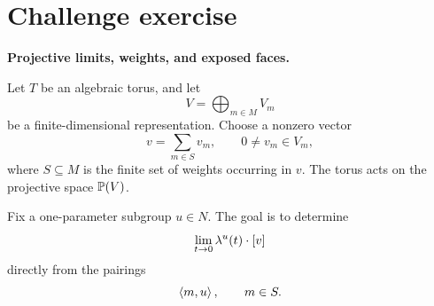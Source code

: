 \clearpage
\section*{Challenge exercise}

\noindent
\textbf{Projective limits, weights, and exposed faces.}

\medskip

Let \(T\) be an algebraic torus, and let
\[
V=\bigoplus_{m\in M}V_m
\]
be a finite-dimensional representation. Choose a nonzero vector
\[
v=\sum_{m\in S}v_m,
\qquad
0\neq v_m\in V_m,
\]
where \(S\subseteq M\) is the finite set of weights occurring in
\(v\). The torus acts on the projective space \(\mathbb{P}(V)\).

Fix a one-parameter subgroup \(u\in N\). The goal is to determine
\[
\lim_{t\to0}\lambda^{u}(t)\cdot[v]
\]
directly from the pairings
\[
\left\langle m,u\right\rangle,
\qquad
m\in S.
\]

